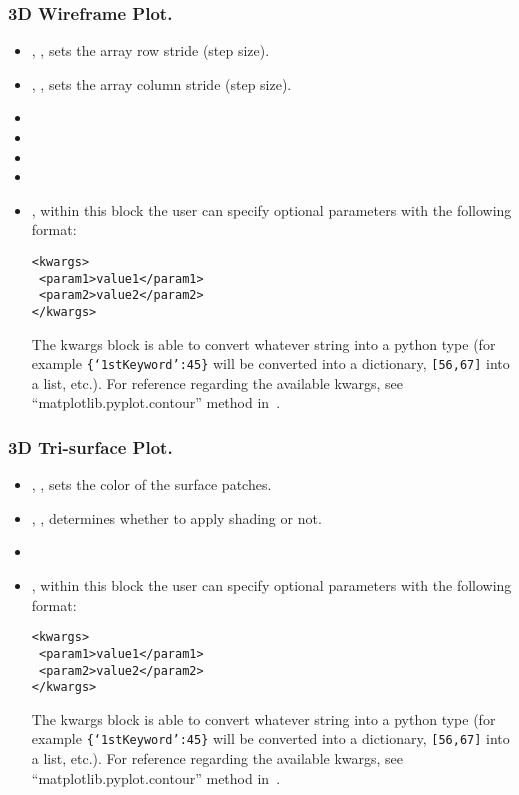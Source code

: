 \subsubsection{3D Wireframe Plot.}
\begin{itemize}
  \item {}, , sets the array row
  stride (step size).
  \item {}, , sets the array
  column stride (step size).
  \item {}
  \item {}
  \item {}
  \item {}
  \item {}, within this block the user can specify optional
  parameters with the following format:

\begin{lstlisting}[style=XML]
<kwargs>
 <param1>value1</param1>
 <param2>value2</param2>
</kwargs>
\end{lstlisting}

  The kwargs block is able to convert whatever string into a python type (for
  example \texttt{\{`1stKeyword':45\}} will
  be converted into a dictionary, 
  \texttt{[56,67]} into a list, etc.).
  For reference regarding the available kwargs, see
  ``matplotlib.pyplot.contour'' method in~\cite{MatPlotLib}.
\end{itemize}

\subsubsection{3D Tri-surface Plot.}
\begin{itemize}
  \item {}, , sets the color of the
  surface patches.
  \item {}, , determines whether 
  to apply shading or not.
  \item {}
  \item {}, within this block the user can specify optional
  parameters with the following format:

\begin{lstlisting}[style=XML]
<kwargs>
 <param1>value1</param1>
 <param2>value2</param2>
</kwargs>
\end{lstlisting}

  The kwargs block is able to convert whatever string into a python type (for
  example \texttt{\{`1stKeyword':45\}} will
  be converted into a dictionary, 
  \texttt{[56,67]} into a list, etc.).
  For reference regarding the available kwargs, see
  ``matplotlib.pyplot.contour'' method in~\cite{MatPlotLib}.
\end{itemize}

